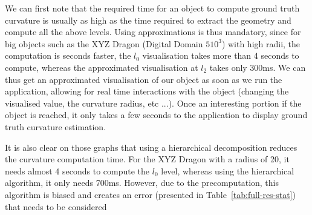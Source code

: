 \documentclass{llncs}
\begin{document}
We can first note that the required time for an object to compute ground truth
curvature is usually as high as the time required to extract the geometry and
compute all the above levels. Using approximations is thus mandatory, since for
big objects such as the XYZ Dragon (Digital Domain $510^3$) with high radii, the
computation is seconds faster, the $l_0$ visualisation takes more than 4 seconds
to compute, whereas the approximated visualisation at $l_2$ takes only 300ms. We
can thus get an approximated visualisation of our object as soon as we run the
application, allowing for real time interactions with the object (changing the
visualised value, the curvature radius, etc ...). Once an interesting portion if
the object is reached, it only takes a few seconds to the application to display
ground truth curvature estimation.

It is also clear on those graphs that using a hierarchical decomposition reduces
the curvature computation time. For the XYZ Dragon with a radius of 20, it needs
almost 4 seconds to compute the $l_0$ level, whereas using the hierarchical
algorithm, it only needs 700ms. However, due to the precomputation, this
algorithm is biased and creates an error (presented in
Table~\ref{tab:full-res-stat}) that needs to be considered


%
\end{document}
